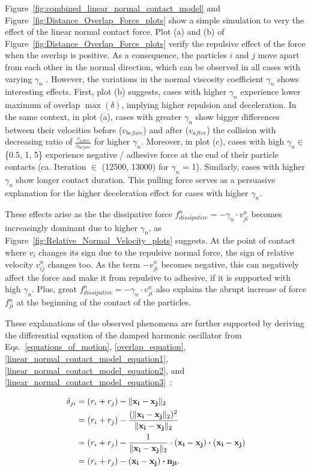 \documentclass[11pt,
               a4paper,
               bibtotoc,
               idxtotoc,
               headsepline,
               footsepline,
               footexclude,
               BCOR12mm,
               DIV13,
               openany,   %
               ]
               {scrbook}
\begin{document}
Figure~\ref{fig:combined_linear_normal_contact_model} and Figure~\ref{fig:Distance_Overlap_Force_plots} show a simple simulation to very the effect of the linear normal contact force.  Plot (a) and (b) of Figure~\ref{fig:Distance_Overlap_Force_plots} verify the repulsive effect of the force when the overlap is positive. As a consequence, the particles $i$ and $j$ move apart from each other in the normal direction, which can be observed in all cases with varying $\gamma_n$ .  
However, the variations in the normal viscosity coefficient $\gamma_n$ shows interesting effects. First, plot (b) suggests, cases with higher $\gamma_n$ experience lower maximum of overlap $\max(\delta)$, implying higher repulsion and deceleration. In the same context, in plot (a), cases with greater $\gamma_n$ show bigger differences between their velocities before ($v_{before}$) and after ($v_{after}$) the collision with decreasing ratio of $\frac{v_{after}}{v_{before}}$ for higher $\gamma_n$. Moreover, in plot (c), cases with high $\gamma_n \in$ \{0.5, 1, 5\} experience negative  / adhesive force at the end of their particle contacts (ca. Iteration $\in$ (12500, 13000) for $\gamma_n$ = 1). Similarly, cases with higher $\gamma_n$ show longer contact duration. This pulling force serves as a persuasive explanation for the higher deceleration effect for cases with higher $\gamma_n$.

These effects arise as the the dissipative force $f^n_{dissipative} = -\gamma_n \cdot v^n_{ji}$ becomes increasingly dominant due to higher $\gamma_n$, as Figure~\ref{fig:Relative_Normal_Velocity_plots} suggests. At the point of contact where $v_i$ changes its sign due to the repulsive normal force, the sign of relative velocity $v^n_{ij}$ changes too. As the term $-v^n_{ji}$ becomes negative, this can negatively affect the force and make it from repulsive to adhesive, if it is supported with high $\gamma_n$. Plus, great $f^n_{dissipative} = -\gamma_n \cdot v^n_{ji}$ also explains the abrupt increase of force $f^n_{ji}$ at the beginning of the contact of the particles.


These explanations of the observed phenomena are further supported by deriving the differential equation of the damped harmonic oscillator from Eqs.~\ref{equations_of_motion}, \ref{overlap_equation}, \ref{linear_normal_contact_model_equation1}, \ref{linear_normal_contact_model_equation2}, and \ref{linear_normal_contact_model_equation3}~\cite{Luding1998, Luding2008}:

\begin{align}
	\delta_{ji} &= (r_i + r_j) - \lVert \mathbf{x_i} - \mathbf{x_j} \rVert_2 \notag \\
	&= (r_i + r_j) - \frac{(\lVert \mathbf{x_i} - \mathbf{x_j} \rVert_2)^2}{\lVert \mathbf{x_i} - \mathbf{x_j} \rVert_2} \notag \\
	&= (r_i + r_j) - \frac{1}{\lVert \mathbf{x_i} - \mathbf{x_j} \rVert_2} 
	\cdot (\mathbf{x_i} - \mathbf{x_j}) \boldsymbol{\cdot} (\mathbf{x_i} - \mathbf{x_j}) \notag \\
	&= (r_i + r_j) - (\mathbf{x_i} - \mathbf{x_j}) \boldsymbol{\cdot} \mathbf{n_{ji}}.
	\label{overlap_reformulation}
\end{align}
\end{document}
